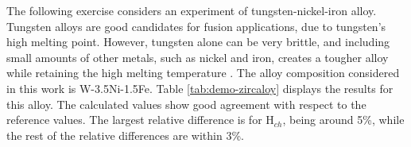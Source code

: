 The following exercise considers an experiment of tungsten-nickel-iron alloy.
% 
Tungsten alloys are good candidates for fusion applications, due to tungsten's high melting point.
However, tungsten alone can be very brittle, and including small amounts of other metals, such as nickel and iron, creates a tougher alloy while retaining the high melting temperature \cite{wong_metals_2023}.
The alloy composition considered in this work is W-3.5Ni-1.5Fe.
%
Table \ref{tab:demo-zircaloy} displays the results for this alloy.
The calculated values show good agreement with respect to the reference values.
The largest relative difference is for H$_{ch}$, being around 5\%, while the rest of the relative differences are within 3\%.



